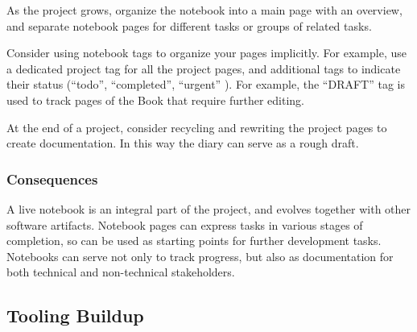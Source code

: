 \documentclass[sigconf]{acmart}
\renewcommand{\nbc}[3]{} %
\newcommand\on[1]{\nbc{ON}{#1}{olive}} %
\newcommand\kh[1]{\nbc{Konrad}{#1}{violet}}
\newcommand{\GT}{\lst{GT}\xspace} %
\begin{document}
As the project grows, organize the notebook into a main page with an overview, and separate notebook pages for different tasks or groups of related tasks.

Consider using notebook tags to organize your pages implicitly. For example, use a dedicated project tag for all the project pages, and additional tags to indicate their status (``todo'', ``completed'', ``urgent'' \etc).
For example, the ``DRAFT'' tag is used to track pages of the \GT Book that require further editing.

At the end of a project, consider recycling and rewriting the project pages to create documentation. In this way the diary can serve as a rough draft.

\kh{The "Project Diary" pattern is a very useful one, and also heavily used
in other contexts (in science we call it a "lab notebook"). But there is
one aspect of it to which is more an ideal than reality: "At the end of
a project, consider recycling and rewriting the project pages to create
documentation. In this way the diary can serve as a rough draft." In my
experience, this rarely happens, and Lepiter supports it even less than
other tools. Typically you want to keep the diary for yourself as a
historical record, so morphing it into documentation for others by
successive edits is not a good approach. Ideally, I'd want to be able to
mark parts of it for inclusion in a new document that I'd then edit, but
I haven't yet seen any support for this. In practice, documentation gets
written from scratch, with the diary serving only as a source of
detailed information to be copy-pasted. Maybe one day we will see
refactoring tools for prose.}

\subsubsection*{Consequences}

A live notebook is an integral part of the project, and evolves together with other software artifacts.
Notebook pages can express tasks in various stages of completion, so can be used as starting points for further development tasks.
Notebooks can serve not only to track progress, but also as documentation for both technical and non-technical stakeholders.

\subsection*{Tooling Buildup}\label{pat:toolingBuildup}
\end{document}
